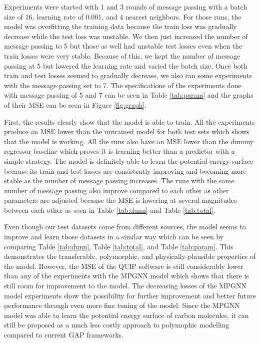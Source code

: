 \documentclass[12pt, abstract = true]{scrartcl}
\begin{document}
Experiments were started with 1 and 3 rounds of message passing with a batch size of 16, learning rate of 0.001, and 4 nearest neighbors. For those runs, the model was overfitting the training data because the train loss was gradually decrease while the test loss was unstable. We then just increased the number of message passing to 5 but those as well had unstable test losses even when the train losses were very stable. Because of this, we kept the number of message passing at 5 but lowered the learning rate and varied the batch size. Once both train and test losses seemed to gradually decrease, we also ran some experiments with the message passing set to 7. The specifications of the experiments done with message passing of 5 and 7 can be seen in Table \ref{tab:param} and the graphs of their MSE can be seen in Figure \ref{fig:graph}.

First, the results clearly show that the model is able to train. All the experiments produce an MSE lower than the untrained model for both test sets which shows that the model is working. All the runs also have an MSE lower than the dummy regressor baseline which proves it is learning better than a predictor with a simple strategy. The model is definitely able to learn the potential energy surface because its train and test losses are consistently improving and becoming more stable as the number of message passing increases. The runs with the same number of message passing also improve compared to each other as other parameters are adjusted because the MSE is lowering at several magnitudes between each other as seen in Table \ref{tab:dunn} and Table \ref{tab:total}.

Even though our test datasets come from different sources, the model seems to improve and learn those datasets in a similar way which can be seen by comparing Table \ref{tab:dunn}, Table \ref{tab:total}, and Table \ref{tab:param}. This demonstrates the transferable, polymorphic, and physically-plausible properties of the model. However, the MSE of the QUIP software is still considerably lower than any of the experiments with the MPGNN model which shows that there is still room for improvement to the model. The decreasing losses of the MPGNN model experiments show the possibility for further improvement and better future performance through even more fine tuning of the model. Since the MPGNN model was able to learn the potential energy surface of carbon molecules, it can still be proposed as a much less costly approach to polymophic modelling compared to current GAP frameworks. 
\end{document}

